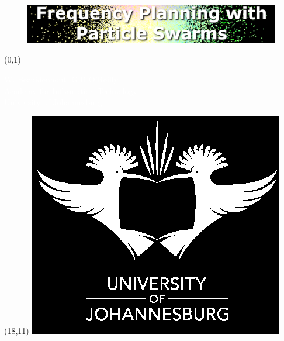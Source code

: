 \documentclass[portrait, a0]{a0poster}
\begin{document}
\begin{figure}
    \centering
	\includegraphics{pics/Title.png}
\end{figure}

\begin{textblock}{26}(0,1)
 \begin{center}
   \Large{\textcolor{white}{W. Bezuidenhout, G.B O'Reilly}} \\
   \Large{\textcolor{white}{Academy for Information Technology}} \\
   \Large{\textcolor{white}{University of Johannesburg}} \\
 \end{center}
\end{textblock}

\begin{textblock}{8}(18,11)
\centering
\includegraphics{pics/ujlogowb.png}
\end{textblock}
\end{document}
